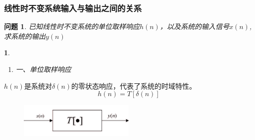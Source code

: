 \documentclass[notheorems,compress,mathserif,table]{beamer}
\newtheorem{dablock}{}
\newtheorem{wenti}{问题}
\begin{document}
\begin{frame}[shrink]\frametitle{线性时不变系统输入与输出之间的关系}%
\begin{wenti}
已知线性时不变系统的单位取样响应$h(n)$，以及系统的输入信号$x(n)$,求系统的输出$y(n)$
\end{wenti}
\begin{dablock}
\begin{enumerate}
  \item []  一、单位取样响应
\end{enumerate}
\end{dablock}
$h(n)$是系统对$\delta(n)$的零状态响应，代表了系统的时域特性。
            $$h(n)=T[\delta(n)]$$
\begin{figure}[h]
  \centering
  \includegraphics[width=0.5\textwidth]{shiyulisanxitong.jpg}\\
\end{figure}


\end{frame}
\end{document}
